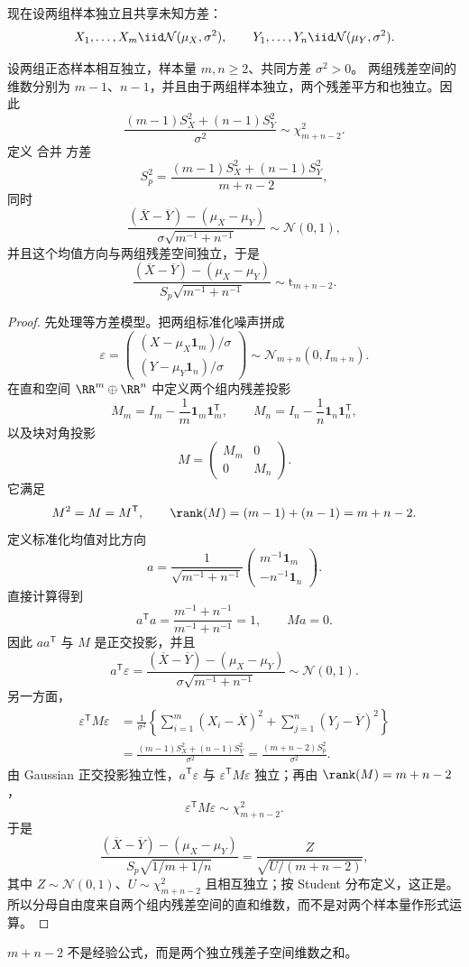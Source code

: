 现在设两组样本独立且共享未知方差：
\[
 X_1,\ldots,X_m\iid\mathcal N(\mu_X,\sigma^2),
 \qquad
 Y_1,\ldots,Y_n\iid\mathcal N(\mu_Y,\sigma^2).
\]
\begin{theorem}[独立等方差正态样本的合并 t 枢轴]
设两组正态样本相互独立，样本量 $m,n\ge2$、共同方差 $\sigma^2>0$。
两组残差空间的维数分别为 $m-1$、$n-1$，并且由于两组样本独立，两个残差平方和也独立。因此
\[
 \frac{(m-1)S_X^2+(n-1)S_Y^2}{\sigma^2}
 \sim\chi^2_{m+n-2}.
\]
定义 合并 方差
\[
 S_p^2
 =\frac{(m-1)S_X^2+(n-1)S_Y^2}{m+n-2},
\]
同时
\[
 \frac{(\overline X-\overline Y)-(\mu_X-\mu_Y)}
 {\sigma\sqrt{m^{-1}+n^{-1}}}
 \sim\mathcal N(0,1),
\]
并且这个均值方向与两组残差空间独立，于是
\begin{equation}\label{eq:math-stat-pooled-two-sample-t}
 \frac{(\overline X-\overline Y)-(\mu_X-\mu_Y)}
 {S_p\sqrt{m^{-1}+n^{-1}}}
 \sim\mathrm t_{m+n-2}.
\end{equation}
\end{theorem}
\begin{proof}
先处理等方差模型。把两组标准化噪声拼成
\[
 \varepsilon
 =\begin{pmatrix}
 (X-\mu_X\mathbf1_m)/\sigma\\
 (Y-\mu_Y\mathbf1_n)/\sigma
 \end{pmatrix}
 \sim\mathcal N_{m+n}(0,I_{m+n}).
\]
在直和空间 $\RR^m\oplus\RR^n$ 中定义两个组内残差投影
\[
 M_m=I_m-\frac1m\mathbf1_m\mathbf1_m^{\mathsf T},
 \qquad
 M_n=I_n-\frac1n\mathbf1_n\mathbf1_n^{\mathsf T},
\]
以及块对角投影
\[
 M=\begin{pmatrix}
 M_m&0\\
 0&M_n
 \end{pmatrix}.
\]
它满足
\[
 M^2=M=M^{\mathsf T},
 \qquad
 \rank(M)=(m-1)+(n-1)=m+n-2.
\]
定义标准化均值对比方向
\[
 a
 =\frac{1}{\sqrt{m^{-1}+n^{-1}}}
 \begin{pmatrix}
 m^{-1}\mathbf1_m\\
 -n^{-1}\mathbf1_n
 \end{pmatrix}.
\]
直接计算得到
\[
 a^{\mathsf T}a
 =\frac{m^{-1}+n^{-1}}{m^{-1}+n^{-1}}
 =1,
 \qquad
 Ma=0.
\]
因此 $aa^{\mathsf T}$ 与 $M$ 是正交投影，并且
\[
 a^{\mathsf T}\varepsilon
 =\frac{(\overline X-\overline Y)-(\mu_X-\mu_Y)}
 {\sigma\sqrt{m^{-1}+n^{-1}}}
 \sim\mathcal N(0,1).
\]
另一方面，
\begin{align*}
 \varepsilon^{\mathsf T}M\varepsilon
 &=\frac{1}{\sigma^2}
 \left\{
 \sum_{i=1}^m(X_i-\overline X)^2
 +\sum_{j=1}^n(Y_j-\overline Y)^2
 \right\}\\
 &=\frac{(m-1)S_X^2+(n-1)S_Y^2}{\sigma^2}
 =\frac{(m+n-2)S_p^2}{\sigma^2}.
\end{align*}
由 Gaussian 正交投影独立性，$a^{\mathsf T}\varepsilon$ 与
$\varepsilon^{\mathsf T}M\varepsilon$ 独立；再由 $\rank(M)=m+n-2$，
\[
 \varepsilon^{\mathsf T}M\varepsilon\sim\chi^2_{m+n-2}.
\]
于是
\[
 \frac{(\overline X-\overline Y)-(\mu_X-\mu_Y)}
 {S_p\sqrt{1/m+1/n}}
 =\frac{Z}{\sqrt{U/(m+n-2)}},
\]
其中 $Z\sim\mathcal N(0,1)$、$U\sim\chi^2_{m+n-2}$ 且相互独立；按 Student 分布定义，这正是。所以分母自由度来自两个组内残差空间的直和维数，而不是对两个样本量作形式运算。
\end{proof}
$m+n-2$ 不是经验公式，而是两个独立残差子空间维数之和。

